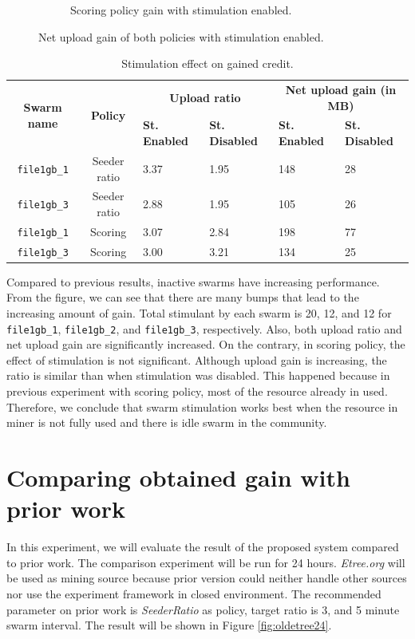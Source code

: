 \begin{figure}[b!]
\begin{adjustwidth}{-1.5cm}{}
\begin{subfigure}[t]{0.6\textwidth}
			\caption{Scoring policy gain with stimulation enabled.}
			\label{fig:simplescsrtrig}
		\end{subfigure}
		\caption{Net upload gain of both policies with stimulation enabled.}
	\end{adjustwidth}
\end{figure}

\begin{table}[h]
	\centering
	\caption{Stimulation effect on gained credit.}
	\label{tbl:stimul}
	\begin{tabular}{|c|c|l|l|l|l|}
		\hline
		\multirow{2}{*}{\textbf{Swarm name}} & \multirow{2}{*}{\textbf{Policy}} & \multicolumn{2}{c|}{\textbf{Upload ratio}} & \multicolumn{2}{c|}{\textbf{Net upload gain (in MB)}} \\ \cline{3-6} 
		&  & \textbf{St. Enabled} & \textbf{St. Disabled} & \textbf{St. Enabled} & \textbf{St. Disabled} \\ \hline
		\texttt{file1gb\_1} & Seeder ratio & 3.37 & 1.95 & 148 & 28 \\ \hline
		\texttt{file1gb\_3} & Seeder ratio & 2.88 & 1.95 & 105 & 26 \\ \hline
		\texttt{file1gb\_1} & Scoring & 3.07 & 2.84 & 198 & 77 \\ \hline
		\texttt{file1gb\_3} & Scoring & 3.00 & 3.21 & 134 & 25 \\ \hline
	\end{tabular}
\end{table}

Compared to previous results, inactive swarms have  increasing performance. From the figure, we can see that there are many bumps that lead to the increasing amount of gain. Total stimulant by each swarm is 20, 12, and 12 for \texttt{file1gb\_1}, \texttt{file1gb\_2}, and \texttt{file1gb\_3}, respectively. Also, both upload ratio and net upload gain are significantly increased. On the contrary, in scoring policy, the effect of stimulation is not significant. Although upload gain is increasing, the ratio is similar than when stimulation was disabled. This happened because in previous experiment with scoring policy, most of the resource already in used. Therefore, we conclude that swarm stimulation works best when the resource in miner is not fully used and there is idle swarm in the community.

\section{Comparing obtained gain with prior work}
In this experiment, we will evaluate the result of the proposed system compared to prior work. The comparison experiment will be run for 24 hours. \textit{Etree.org} will be used as mining source because prior version could neither handle other sources nor use the experiment framework in closed environment. The recommended parameter on prior work is \textit{SeederRatio} as policy, target ratio is 3, and 5 minute swarm interval. The result will be shown in Figure \ref{fig:oldetree24}.

